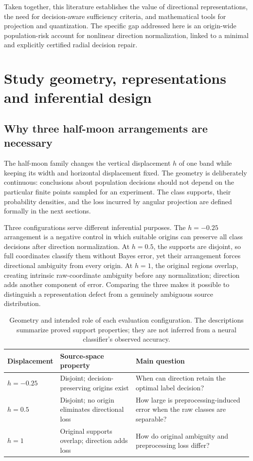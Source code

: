 \documentclass[12pt,a4paper]{article}
\begin{document}
Taken together, this literature establishes the value of directional representations, the need for decision-aware sufficiency criteria, and mathematical tools for projection and quantization. The specific gap addressed here is an origin-wide population-risk account for nonlinear direction normalization, linked to a minimal and explicitly certified radial decision repair.


\section{Study geometry, representations and inferential design}
\subsection{Why three half-moon arrangements are necessary}
The half-moon family changes the vertical displacement \(h\) of one band while keeping its width and horizontal displacement fixed. The geometry is deliberately continuous: conclusions about population decisions should not depend on the particular finite points sampled for an experiment. The class supports, their probability densities, and the loss incurred by angular projection are defined formally in the next sections.

Three configurations serve different inferential purposes. The \(h=-0.25\) arrangement is a negative control in which suitable origins can preserve all class decisions after direction normalization. At \(h=0.5\), the supports are disjoint, so full coordinates classify them without Bayes error, yet their arrangement forces directional ambiguity from every origin. At \(h=1\), the original regions overlap, creating intrinsic raw-coordinate ambiguity before any normalization; direction adds another component of error. Comparing the three makes it possible to distinguish a representation defect from a genuinely ambiguous source distribution.

\begin{table}[htbp]\centering
\caption{Geometry and intended role of each evaluation configuration. The descriptions summarize proved support properties; they are not inferred from a neural classifier's observed accuracy.}
\label{tab:study-geometry}
\begin{tabular}{p{23mm}p{55mm}p{62mm}}
\toprule
Displacement & Source-space property & Main question\\
\midrule
\(h=-0.25\) & Disjoint; decision-preserving origins exist & When can direction retain the optimal label decision?\\
\(h=0.5\) & Disjoint; no origin eliminates directional loss & How large is preprocessing-induced error when the raw classes are separable?\\
\(h=1\) & Original supports overlap; direction adds loss & How do original ambiguity and preprocessing loss differ?\\
\bottomrule
\end{tabular}
\end{table}
\end{document}
